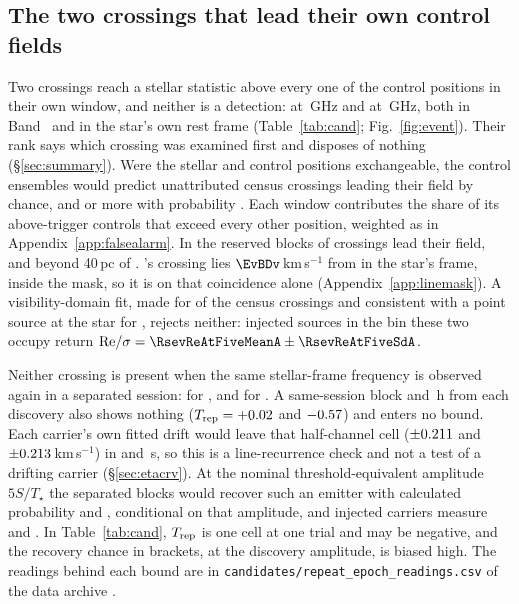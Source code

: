 \subsection{The two crossings that lead their own control fields}
\label{sec:vistest}

Two crossings reach a stellar statistic above every one of the \NCtrl{}
control positions in their own window, and neither is a detection: \EvAStar{}
at \RqFreqSx\,GHz and \EvBStar{} at \RqFreqCp\,GHz, both in Band~\EvABand{}
and in the star's own rest frame (Table~\ref{tab:cand};
Fig.~\ref{fig:event}). Their rank says which crossing was examined first and
disposes of nothing (\S\ref{sec:summary}). Were the stellar and control
positions exchangeable, the control ensembles would predict \RkCondExp{} unattributed census crossings leading their field
by chance, and \RkCondNObsWord{} or more with probability \RkCondProb. Each
window contributes the share of its above-trigger controls that exceed every
other position, weighted as in Appendix~\ref{app:falsealarm}. In the reserved
blocks \RkHoLead{} of \RkHoN{} crossings lead their field, and beyond 40\,pc
\RkOosLead{} of \RkOosN.
\EvBStar's crossing lies $\EvBDv$\,km\,s$^{-1}$ from \EvBLine{} in the star's
frame, inside the mask, so it is \EvBDispo{} on that coincidence alone
(Appendix~\ref{app:linemask}). A visibility-domain fit, made for
\CsNVisFit{} of the \CsNCross{} census crossings and consistent with a point
source at the star for \CsNVisLocal, rejects neither: injected sources in the
bin these two occupy return ${\rm Re}/\sigma=\RsevReAtFiveMeanA\pm
\RsevReAtFiveSdA$.

Neither crossing is present when the same stellar-frame frequency is observed
again in a separated session: for \EvAStar{} \RcSxSepClause, and for \EvBStar{}
\RcCpSepClause. A same-session block \RcSxSameH{} and \RcCpSameH\,h from each
discovery also shows nothing ($T_{\rm rep}=+0.02$ and
$-0.57$) and enters no bound. Each carrier's own fitted drift would leave that
half-channel cell ($\pm0.211$ and $\pm0.213$\,km\,s$^{-1}$) in
\ZtSxLeaveSec{} and \ZtCpLeaveSec\,s, so this is a line-recurrence check and
not a test of a drifting carrier (\S\ref{sec:etacrv}). At the nominal
threshold-equivalent amplitude $5S/T_\star$ the separated blocks would recover
such an emitter with calculated probability \RcSxPowerTrig{} and
\RcCpPowerTrig, conditional on that amplitude, and injected carriers measure
\HjMeasSx{} and \HjMeasCp. In
Table~\ref{tab:cand}, $T_{\rm rep}$ is one cell at one trial and may be
negative, and the recovery chance in brackets, at the discovery amplitude, is
biased high. The
readings behind each bound are in
\texttt{candidates/repeat\_epoch\_readings.csv} of the data archive
\citep{SIdeposit}.

